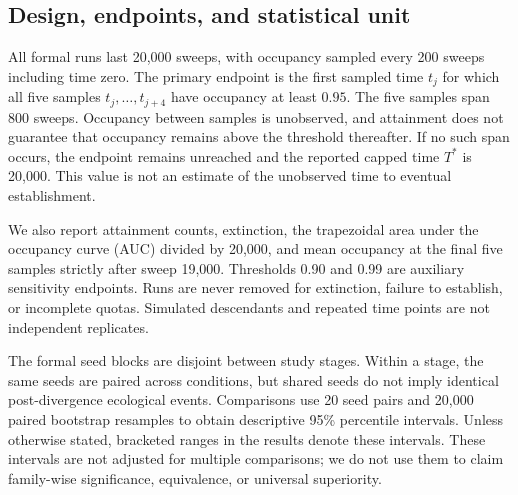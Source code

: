 \documentclass[11pt]{article}
\begin{document}
\subsection{Design, endpoints, and statistical unit}
All formal runs last 20,000 sweeps, with occupancy sampled every 200 sweeps including time zero. The primary endpoint is the first sampled time $t_j$ for which all five samples $t_j,\ldots,t_{j+4}$ have occupancy at least $0.95$. The five samples span 800 sweeps. Occupancy between samples is unobserved, and attainment does not guarantee that occupancy remains above the threshold thereafter. If no such span occurs, the endpoint remains unreached and the reported capped time $T^*$ is 20,000. This value is not an estimate of the unobserved time to eventual establishment.

We also report attainment counts, extinction, the trapezoidal area under the occupancy curve (AUC) divided by 20,000, and mean occupancy at the final five samples strictly after sweep 19,000. Thresholds 0.90 and 0.99 are auxiliary sensitivity endpoints. Runs are never removed for extinction, failure to establish, or incomplete quotas. Simulated descendants and repeated time points are not independent replicates.

The formal seed blocks are disjoint between study stages. Within a stage, the same seeds are paired across conditions, but shared seeds do not imply identical post-divergence ecological events. Comparisons use 20 seed pairs and 20,000 paired bootstrap resamples to obtain descriptive 95\% percentile intervals. Unless otherwise stated, bracketed ranges in the results denote these intervals. These intervals are not adjusted for multiple comparisons; we do not use them to claim family-wise significance, equivalence, or universal superiority.
\end{document}
